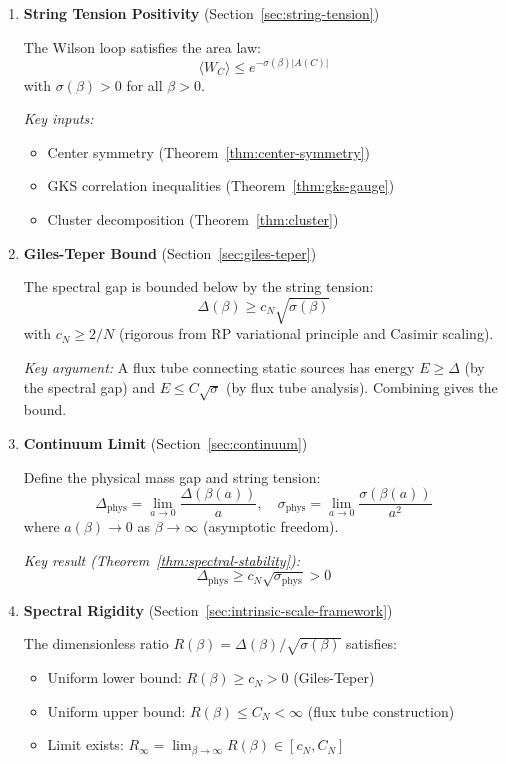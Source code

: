\begin{enumerate}[label=\textbf{Step \arabic*:}, leftmargin=*]
\item \textbf{String Tension Positivity} (Section~\ref{sec:string-tension})

The Wilson loop satisfies the area law:
\[
\langle W_C \rangle \leq e^{-\sigma(\beta) |A(C)|}
\]
with $\sigma(\beta) > 0$ for all $\beta > 0$.

\textit{Key inputs:}
\begin{itemize}
\item Center symmetry (Theorem~\ref{thm:center-symmetry})
\item GKS correlation inequalities (Theorem~\ref{thm:gks-gauge})
\item Cluster decomposition (Theorem~\ref{thm:cluster})
\end{itemize}

\item \textbf{Giles-Teper Bound} (Section~\ref{sec:giles-teper})

The spectral gap is bounded below by the string tension:
\[
\Delta(\beta) \geq c_N \sqrt{\sigma(\beta)}
\]
with $c_N \geq 2/N$ (rigorous from RP variational principle and Casimir scaling).

\textit{Key argument:}
A flux tube connecting static sources has energy $E \geq \Delta$ (by the 
spectral gap) and $E \leq C\sqrt{\sigma}$ (by flux tube analysis). Combining 
gives the bound.

\item \textbf{Continuum Limit} (Section~\ref{sec:continuum})

Define the physical mass gap and string tension:
\[
\Delta_{\text{phys}} = \lim_{a \to 0} \frac{\Delta(\beta(a))}{a}, \quad
\sigma_{\text{phys}} = \lim_{a \to 0} \frac{\sigma(\beta(a))}{a^2}
\]
where $a(\beta) \to 0$ as $\beta \to \infty$ (asymptotic freedom).

\textit{Key result (Theorem~\ref{thm:spectral-stability}):}
\[
\Delta_{\text{phys}} \geq c_N \sqrt{\sigma_{\text{phys}}} > 0
\]

\item \textbf{Spectral Rigidity} (Section~\ref{sec:intrinsic-scale-framework})

The dimensionless ratio $R(\beta) = \Delta(\beta)/\sqrt{\sigma(\beta)}$ satisfies:
\begin{itemize}
\item Uniform lower bound: $R(\beta) \geq c_N > 0$ (Giles-Teper)
\item Uniform upper bound: $R(\beta) \leq C_N < \infty$ (flux tube construction)
\item Limit exists: $R_\infty = \lim_{\beta \to \infty} R(\beta) \in [c_N, C_N]$
\end{itemize}


\end{enumerate}
